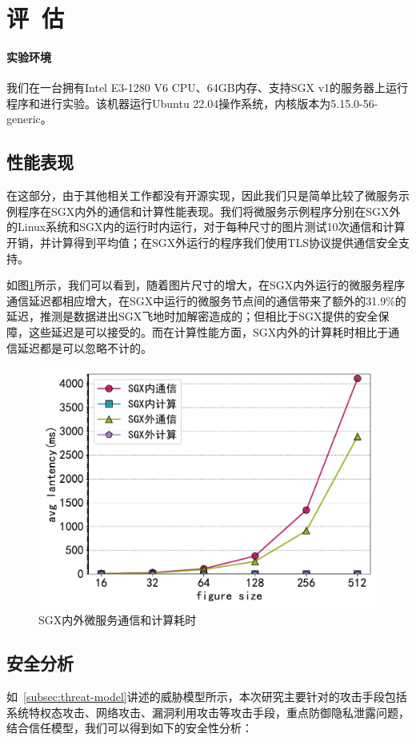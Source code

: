 \section{评\ 估}\label{sec:evaluation}

\paragraph{实验环境}

我们在一台拥有Intel E3-1280 V6 CPU、64GB内存、支持SGX v1的服务器上运行程序和进行实验。该机器运行Ubuntu 22.04操作系统，内核版本为5.15.0-56-generic。

\subsection{性能表现}

在这部分，由于其他相关工作都没有开源实现，因此我们只是简单比较了微服务示例程序在SGX内外的通信和计算性能表现。我们将微服务示例程序分别在SGX外的Linux系统和SGX内的运行时内运行，对于每种尺寸的图片测试10次通信和计算开销，并计算得到平均值；在SGX外运行的程序我们使用TLS协议提供通信安全支持。

如图\ref{fig:evaluation}所示，我们可以看到，随着图片尺寸的增大，在SGX内外运行的微服务程序通信延迟都相应增大，在SGX中运行的微服务节点间的通信带来了额外的31.9\%的延迟，推测是数据进出SGX飞地时加解密造成的；但相比于SGX提供的安全保障，这些延迟是可以接受的。而在计算性能方面，SGX内外的计算耗时相比于通信延迟都是可以忽略不计的。

\begin{figure}[!ht]
    \centering
    \includegraphics[width=.5\textwidth]{figures/evaluation.pdf}
    \caption{SGX内外微服务通信和计算耗时}
    \label{fig:evaluation}
\end{figure}

\subsection{安全分析}

如~\cref{subsec:threat-model}讲述的威胁模型所示，本次研究主要针对的攻击手段包括系统特权态攻击、网络攻击、漏洞利用攻击等攻击手段，重点防御隐私泄露问题，结合信任模型，我们可以得到如下的安全性分析：


